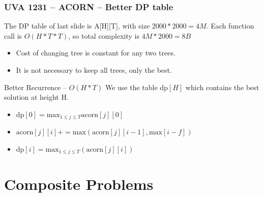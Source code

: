 \begin{frame}
  \frametitle{UVA 1231 -- ACORN -- Better DP table}

  {\smaller
    \begin{alertblock}{}
      The DP table of last slide is A[H][T], with size $2000*2000=4M$.
      Each function call is $O(H*T*T)$, so total complexity is
      $4M*2000=8B$
    \end{alertblock}

    \medskip

    \begin{itemize}
    \item Cost of changing tree is constant for any two trees.
    \item It is not necessary to keep all trees, only the best.
    \end{itemize}

    \medskip

    \begin{block}{Better Recurrence -- $O(H*T)$}
      We use the table dp$[H]$ which contains the best solution at height H.

      \medskip

      \begin{itemize}
      \item $\text{dp}[0] = \text{max}_{1\leq j\leq T}\text{acorn}[j][0]$
       \medskip

      \item $\text{acorn}[j][i] += \text{max}(\text{acorn}[j][i-1], \text{max}[i-f])$
        \medskip

      \item $\text{dp}[i] = \text{max}_{1\leq j\leq T}(\text{acorn}[j][i])$
      \end{itemize}
    \end{block}
  }
\end{frame}


\section{Composite Problems}
